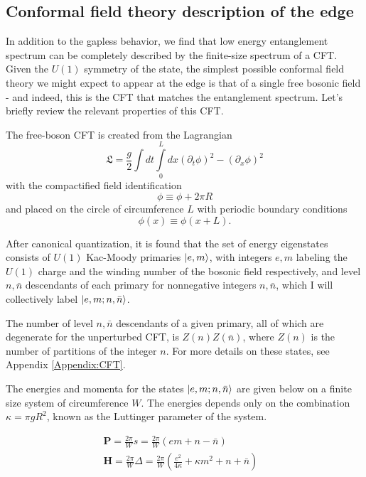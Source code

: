 \subsection{Conformal field theory description of the edge}
\label{sec:CFT}

In addition to the gapless behavior, we find that low energy entanglement spectrum
can be completely described by the finite-size spectrum of a CFT. 
Given the $U(1)$ symmetry of the state, the simplest possible
conformal field theory we might expect to appear at the edge is that
of a single free bosonic field - and indeed, this is the CFT that matches the 
entanglement spectrum.
Let's briefly review the relevant properties of this CFT.\cite{difrancesco}

The free-boson CFT is created from the Lagrangian
$$ \mathfrak{L} = \frac{g}{2}\int dt \int\limits_0^L dx (\partial_t \phi)^2 - (\partial_x \phi)^2$$
with the compactified field identification
$$ \phi \equiv \phi + 2\pi R$$
and placed on the circle of circumference $L$ with periodic boundary conditions
$$ \phi(x) \equiv \phi(x+L).$$



After canonical quantization, it is found that the set of energy
eigenstates consists of $U(1)$ Kac-Moody primaries $\vert e, m \rangle$, with
integers $e, m$ labeling the $U(1)$ charge and the winding number of
the bosonic field respectively, and level $n, \bar{n}$ descendants of each primary for
nonnegative integers $n,\bar{n}$,
which I will collectively label $\vert e, m; n, \bar{n} \rangle$.

The number of level $n, \bar{n}$ descendants of a given
primary, all of which are degenerate for the unperturbed CFT, is $Z(n) Z(\bar{n})$, where
$Z(n)$ is the number of partitions of the integer $n$.
For more details on these states, see Appendix \ref{Appendix:CFT}.

The energies and momenta for the states $\vert e, m; n, \bar{n} \rangle$ are given below
on a finite size system of circumference $W$.
The energies depends only on the combination $\kappa = \pi g R^2$,
known as the Luttinger parameter of the system. \cite{giamarchi}

\begin{align*}
	\mathbf{P} =\frac{2\pi}{W} s
	= \frac{2\pi}{W}(em + n - \bar{n})&  \\
	\mathbf{H} = \frac{2\pi}{W}\Delta
	= \frac{2\pi}{W}(\frac{e^2}{4\kappa} + \kappa m^2 + n + \bar{n})& %
\end{align*}

